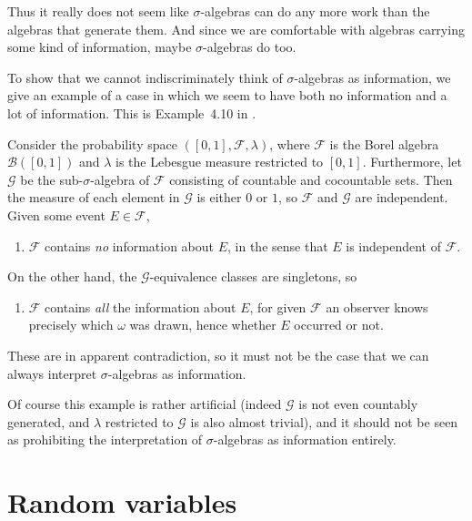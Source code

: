 \documentclass[article, a4paper, 11pt, oneside]{memoir}
\numberwithin{equation}{chapter}
\newcommand{\calB}{\mathcal{B}}
\newcommand{\calF}{\mathcal{F}}
\newcommand{\calG}{\mathcal{G}}
\newcommand{\calC}{\mathcal{C}}
\newcommand{\borel}[1]{\calB(#1)}
\begin{document}

Thus it really does not seem like $\sigma$-algebras can do any more work than the algebras that generate them. And since we are comfortable with algebras carrying some kind of information, maybe $\sigma$-algebras do too.

To show that we cannot indiscriminately think of $\sigma$-algebras as information, we give an example of a case in which we seem to have both no information and a lot of information. This is Example~4.10 in \textcite{billingsley1995}.

\begin{example}
    Consider the probability space $([0,1], \calF, \lambda)$, where $\calF$ is the Borel algebra $\borel{[0,1]}$ and $\lambda$ is the Lebesgue measure restricted to $[0,1]$. Furthermore, let $\calG$ be the sub-$\sigma$-algebra of $\calF$ consisting of countable and cocountable sets. Then the measure of each element in $\calG$ is either $0$ or $1$, so $\calF$ and $\calG$ are independent. Given some event $E \in \calF$,
    \begin{enumerate}[label=\normalfont(\alph*)]
        \item $\calF$ contains \emph{no} information about $E$, in the sense that $E$ is independent of $\calF$.
    \end{enumerate}
    On the other hand, the $\calG$-equivalence classes are singletons, so
    \begin{enumerate}[resume, label=\normalfont(\alph*)]
        \item $\calF$ contains \emph{all} the information about $E$, for given $\calF$ an observer knows precisely which $\omega$ was drawn, hence whether $E$ occurred or not.
    \end{enumerate}
    These are in apparent contradiction, so it must not be the case that we can always interpret $\sigma$-algebras as information.

    Of course this example is rather artificial (indeed $\calG$ is not even countably generated, and $\lambda$ restricted to $\calG$ is also almost trivial), and it should not be seen as prohibiting the interpretation of $\sigma$-algebras as information entirely.
\end{example}


\section{Random variables}
\end{document}
